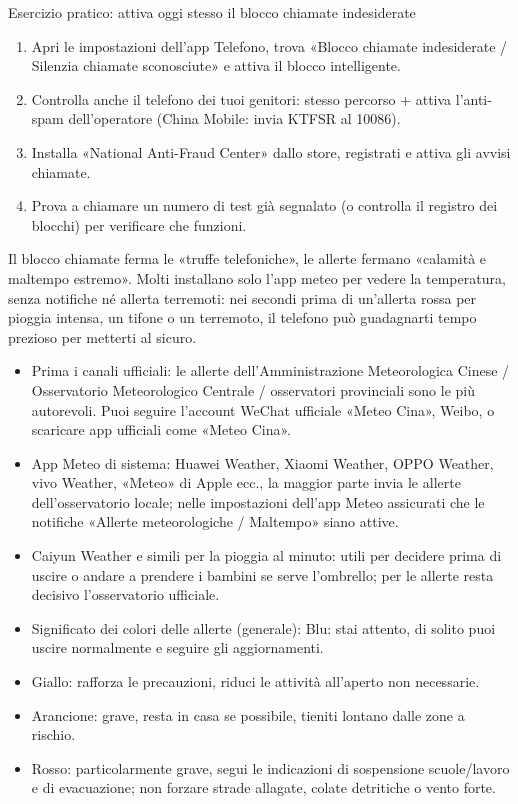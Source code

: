 \begin{tcbpractice}{Esercizio pratico: attiva oggi stesso il blocco chiamate indesiderate}
\begin{enumerate}
  \item Apri le impostazioni dell'app Telefono, trova «Blocco chiamate indesiderate / Silenzia chiamate sconosciute» e attiva il blocco intelligente.
  \item Controlla anche il telefono dei tuoi genitori: stesso percorso + attiva l'anti-spam dell'operatore (China Mobile: invia KTFSR al 10086).
  \item Installa «National Anti-Fraud Center» dallo store, registrati e attiva gli avvisi chiamate.
  \item Prova a chiamare un numero di test già segnalato (o controlla il registro dei blocchi) per verificare che funzioni.
\end{enumerate}

\end{tcbpractice}


Il blocco chiamate ferma le «truffe telefoniche», le allerte fermano «calamità e maltempo estremo». Molti installano solo l'app meteo per vedere la temperatura, senza notifiche né allerta terremoti: nei secondi prima di un'allerta rossa per pioggia intensa, un tifone o un terremoto, il telefono può guadagnarti tempo prezioso per metterti al sicuro.


\begin{itemize}
  \item Prima i canali ufficiali: le allerte dell'Amministrazione Meteorologica Cinese / Osservatorio Meteorologico Centrale / osservatori provinciali sono le più autorevoli. Puoi seguire l'account WeChat ufficiale «Meteo Cina», Weibo, o scaricare app ufficiali come «Meteo Cina».
  \item App Meteo di sistema: Huawei Weather, Xiaomi Weather, OPPO Weather, vivo Weather, «Meteo» di Apple ecc., la maggior parte invia le allerte dell'osservatorio locale; nelle impostazioni dell'app Meteo assicurati che le notifiche «Allerte meteorologiche / Maltempo» siano attive.
  \item Caiyun Weather e simili per la pioggia al minuto: utili per decidere prima di uscire o andare a prendere i bambini se serve l'ombrello; per le allerte resta decisivo l'osservatorio ufficiale.
  \item Significato dei colori delle allerte (generale): Blu: stai attento, di solito puoi uscire normalmente e seguire gli aggiornamenti.
  \item Giallo: rafforza le precauzioni, riduci le attività all'aperto non necessarie.
  \item Arancione: grave, resta in casa se possibile, tieniti lontano dalle zone a rischio.
  \item Rosso: particolarmente grave, segui le indicazioni di sospensione scuole/lavoro e di evacuazione; non forzare strade allagate, colate detritiche o vento forte.
\end{itemize}

